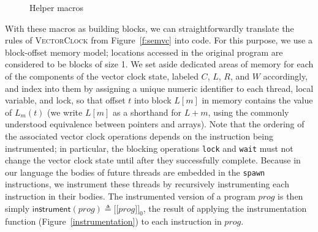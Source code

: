 \documentclass[preprint, 9pt]{sigplanconf}
\newcommand{\VCalg}{\textsc{VectorClock}\xspace}
\newcommand{\meanl}{\ensuremath{[ \! [}}
\newcommand{\meanr}{\ensuremath{] \! ]}}
\newcommand{\means}[1]{\ensuremath{\meanl #1 \meanr}}
\newcommand{\instr}[2]{\ensuremath{\means{#2}_{#1}}}
\newcommand{\instrp}[1]{\ensuremath{\mathsf{instrument}(#1)}}
\begin{document}
\begin{figure}[tb]
\caption{Helper macros}
\label{helper}
\end{figure}

With these macros as building blocks, we can straightforwardly translate the rules of \VCalg from Figure~\ref{f:semvc} into code. For this purpose, we use a block-offset memory model; locations accessed in the original program are considered to be blocks of size 1. We set aside dedicated areas of memory for each of the components of the vector clock state, labeled $C$, $L$, $R$, and $W$ accordingly, and index into them by assigning a unique numeric identifier to each thread, local variable, and lock, so that offset $t$ into block $L[m]$ in memory contains the value of $L_m(t)$ (we write $L[m]$ as a shorthand for $L + m$, using the commonly understood equivalence between pointers and arrays). Note that the ordering of the associated vector clock operations depends on the instruction being instrumented; in particular, the blocking operations \texttt{lock} and \texttt{wait} must not change the vector clock state until after they successfully complete.  Because in our language the bodies of future threads are embedded in the \texttt{spawn} instructions, we instrument these threads by recursively instrumenting each instruction in their bodies. The instrumented version of a program $\mathit{prog}$ is then simply $\instrp{\mathit{prog}} \triangleq \instr{0}{\mathit{prog}}$, the result of applying the instrumentation function (Figure~\ref{instrumentation}) to each instruction in $\mathit{prog}$.
\end{document}
